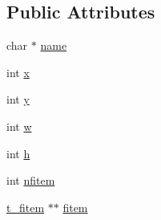 \subsection*{\-Public \-Attributes}
\begin{DoxyCompactItemize}
\item 
char $\ast$ \hyperlink{structt__fgroup_a5cf1e1055121159dd3d2d370e816070e}{name}
\item 
int \hyperlink{structt__fgroup_a2af2c47b5412b70352ac5916cd87b5c1}{x}
\item 
int \hyperlink{structt__fgroup_a38d462a4d6d4477875d1ed37782da6c9}{y}
\item 
int \hyperlink{structt__fgroup_ac3314f8f185907b88412dcd2a720dee3}{w}
\item 
int \hyperlink{structt__fgroup_ab76f6a24701e17934a72f15c40296ad2}{h}
\item 
int \hyperlink{structt__fgroup_a9a1b53eac9e46f47730948f021ef6106}{nfitem}
\item 
\hyperlink{structt__fitem}{t\-\_\-fitem} $\ast$$\ast$ \hyperlink{structt__fgroup_a986b6c4602edfd2041950a6883055992}{fitem}
\end{DoxyCompactItemize}



